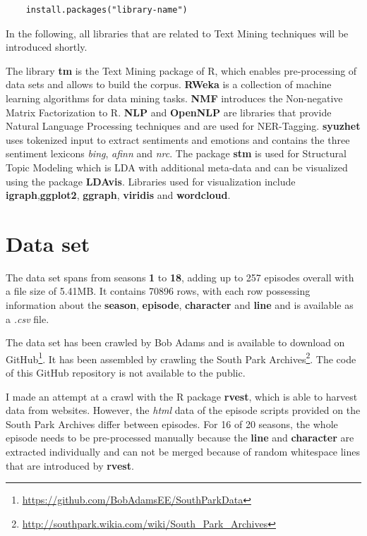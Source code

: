 \documentclass[10pt,a4paper]{article}
\begin{document}
	\begin{verbatim}
	install.packages("library-name")
	\end{verbatim}
	
	In the following, all libraries that are related to Text Mining techniques will be introduced shortly.
	
	The library \textbf{tm} is the Text Mining package of R, which enables pre-processing of data sets and allows to build the corpus. \textbf{RWeka} is a collection of machine learning algorithms for data mining tasks. \textbf{NMF} introduces the Non-negative Matrix Factorization to R.
	\textbf{NLP} and \textbf{OpenNLP} are libraries that provide Natural Language Processing techniques and are used for NER-Tagging. \textbf{syuzhet} uses tokenized input to extract sentiments and emotions and contains the three sentiment lexicons \textit{bing}, \textit{afinn} and \textit{nrc}.
	The package \textbf{stm} is used for Structural Topic Modeling  which is LDA with additional meta-data and can be visualized using the package \textbf{LDAvis}.
	Libraries used for visualization include \textbf{igraph},\textbf{ggplot2}, \textbf{ggraph}, \textbf{viridis} and \textbf{wordcloud}.
	
	\section{Data set}	
	The data set spans from seasons \textbf{1} to \textbf{18}, adding up to 257 episodes overall with a file size of 5.41MB. It contains 70896 rows, with each row possessing information about the \textbf{season}, \textbf{episode}, \textbf{character} and \textbf{line} and is available as a \textit{.csv} file.
	
	The data set has been crawled by Bob Adams and is available to download on GitHub\footnote{\url{https://github.com/BobAdamsEE/SouthParkData}}. It has been assembled by crawling the South Park Archives\footnote{\url{http://southpark.wikia.com/wiki/South_Park_Archives}}. The code of this GitHub repository is not available to the public.
	
	 I made an attempt at a crawl with the R package \textbf{rvest}, which is able to harvest data from websites.  However, the \textit{html} data of the episode scripts provided on the South Park Archives differ between episodes. For 16 of 20 seasons, the whole episode needs to be pre-processed manually because the \textbf{line} and \textbf{character} are extracted individually and can not be merged because of random whitespace lines that are introduced by \textbf{rvest}.
	 
\end{document}

